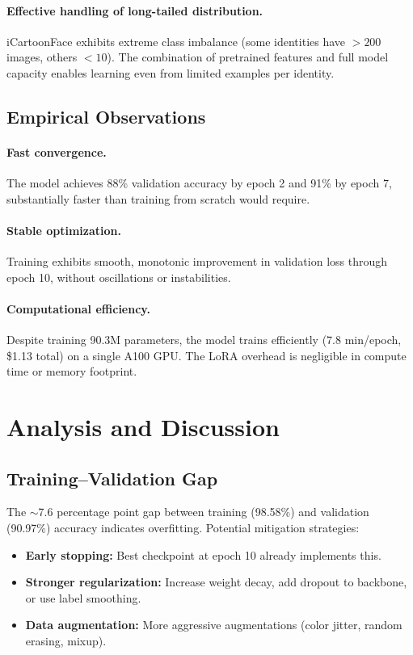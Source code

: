 \documentclass[11pt]{article}
\begin{document}
\paragraph{Effective handling of long-tailed distribution.}
iCartoonFace exhibits extreme class imbalance (some identities have $>200$ images, others $<10$). The combination of pretrained features and full model capacity enables learning even from limited examples per identity.

\subsection{Empirical Observations}

\paragraph{Fast convergence.}
The model achieves 88\% validation accuracy by epoch 2 and 91\% by epoch 7, substantially faster than training from scratch would require.

\paragraph{Stable optimization.}
Training exhibits smooth, monotonic improvement in validation loss through epoch 10, without oscillations or instabilities.

\paragraph{Computational efficiency.}
Despite training 90.3M parameters, the model trains efficiently (7.8 min/epoch, \$1.13 total) on a single A100 GPU. The LoRA overhead is negligible in compute time or memory footprint.

\section{Analysis and Discussion}

\subsection{Training--Validation Gap}

The $\sim$7.6 percentage point gap between training (98.58\%) and validation (90.97\%) accuracy indicates overfitting. Potential mitigation strategies:
\begin{itemize}
    \item \textbf{Early stopping:} Best checkpoint at epoch 10 already implements this.
    \item \textbf{Stronger regularization:} Increase weight decay, add dropout to backbone, or use label smoothing.
    \item \textbf{Data augmentation:} More aggressive augmentations (color jitter, random erasing, mixup).
\end{itemize}
\end{document}
